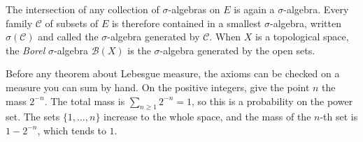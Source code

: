 The intersection of any collection of $\sigma$-algebras on $E$ is again a $\sigma$-algebra.
Every family $\mathcal C$ of subsets of $E$ is therefore contained in a smallest $\sigma$-algebra, written $\sigma(\mathcal C)$ and called the $\sigma$-algebra generated by $\mathcal C$.
When $X$ is a topological space, the \emph{Borel} $\sigma$-algebra $\mathcal B(X)$ is the $\sigma$-algebra generated by the open sets.

Before any theorem about Lebesgue measure, the axioms can be checked on a measure you can sum by hand.
On the positive integers, give the point $n$ the mass $2^{-n}$.
The total mass is $\sum_{n\ge1}2^{-n}=1$, so this is a probability on the power set.
The sets $\{1,\ldots,n\}$ increase to the whole space, and the mass of the $n$-th set is $1-2^{-n}$, which tends to $1$.

